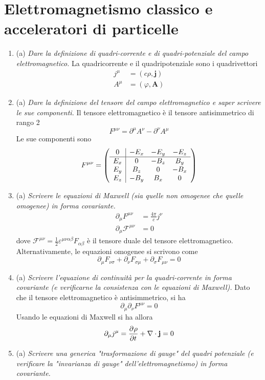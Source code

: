 \documentclass{article}
\renewcommand{\a}{(a)}
\renewcommand{\t}[1]{\textit{ #1}}
\renewcommand{\vec}[1]{\mathbf{#1}}
\begin{document}
\section{Elettromagnetismo classico e acceleratori di particelle}
\begin{enumerate}
	\item\a\t{Dare la definizione di quadri-corrente e di quadri-potenziale del campo
		elettromagnetico.} La quadricorrente e il quadripotenziale sono i quadrivettori
	\begin{align*}j^\mu&=(c\rho,\vec{j})\\A^\mu&=(\varphi,\vec{A})\end{align*}
	\item\a\t{Dare la definizione del tensore del campo elettromagnetico e saper scrivere le sue
		componenti.} Il tensore elettromagnetico è il tensore antisimmetrico di rango 2
	\[F^{\mu\nu}=\partial^\mu A^\nu-\partial^\nu A^\mu\]
	Le sue componenti sono
	\[F^{\mu\nu}=\left(\begin{array}{c| c c c}
	0&-E_x&-E_y&-E_z\\\hline E_x&0&-B_z&B_y\\E_y&B_z&0&-B_x\\E_z&-B_y&B_x&0
	\end{array}\right)\]
	\item\a\t{Scrivere le equazioni di Maxwell (sia quelle non omogenee che quelle omogenee)
		in forma covariante.}
		\begin{align*}
			\partial_\mu F^{\mu\nu}&=\frac{4\pi}{c}j^\nu\\
			\partial_\mu\mathcal{F}^{\mu\nu}&=0
		\end{align*}
		dove $\mathcal{F}^{\mu\nu}=\frac{1}{2}\varepsilon^{\mu\nu\alpha\beta}F_{\alpha\beta}$ è il tensore duale del tensore elettromagnetico. Alternativamente, le equazioni omogenee si scrivono come
		\[\partial_\mu F_{\nu\sigma}+\partial_\nu F_{\sigma\mu}+\partial_\sigma F_{\mu\nu}=0\]
	\item\a\t{Scrivere l'equazione di continuità per la quadri-corrente in forma covariante (e
		verificarne la consistenza con le equazioni di Maxwell).}
	Dato che il tensore elettromagnetico è antisimmetrico, si ha
	\[\partial_\mu\partial_\nu F^{\mu\nu}=0\]
	Usando le equazioni di Maxwell si ha allora
	\[\partial_\mu j^\mu=\pder{\rho}{t}+\nabla\cdot\vec{j}=0\]
	\item\a\t{Scrivere una generica "trasformazione di gauge" del quadri potenziale (e
		verificare la "invarianza di gauge" dell'elettromagnetismo) in forma covariante.}

\end{enumerate}
\end{document}
